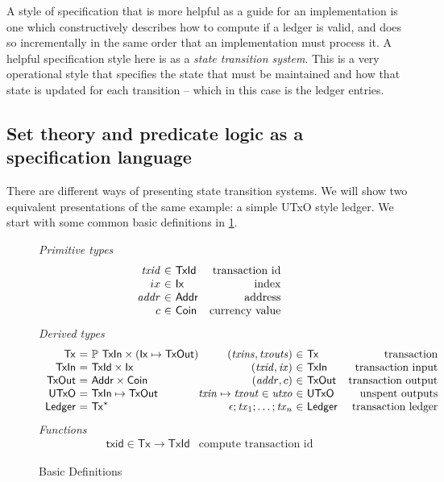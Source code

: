 \documentclass[11pt,a4paper]{article}
\newcommand{\powerset}[1]{\mathbb{P}~#1}
\newcommand{\sequencetype}[1]{#1^\star}
\newcommand{\var}[1]{\mathit{#1}}
\newcommand{\fun}[1]{\mathsf{#1}}
\newcommand{\type}[1]{\mathsf{#1}}
\begin{document}
A style of specification that is more helpful as a guide for an implementation
is one which constructively describes how to compute if a ledger is valid, and
does so incrementally in the same order that an implementation must process it.
A helpful specification style here is as a \emph{state transition system}. This
is a very operational style that specifies the state that must be maintained
and how that state is updated for each transition -- which in this case is the
ledger entries.

\subsection{Set theory and predicate logic as a specification language}

There are different ways of presenting state transition systems. We will show
two equivalent presentations of the same example: a simple UTxO style ledger.
We start with some common basic definitions in \cref{fig:basic_definitions}.

\begin{figure}

\emph{Primitive types}
%
\begin{equation*}
\begin{array}{r@{~\in~}lr}
  \var{txid}
& \type{TxId}
& \text{transaction id}
\\
  ix
& \type{Ix}
& \text{index}
\\
  \var{addr}
& \type{Addr}
& \text{address}
\\
  c
& \type{Coin}
& \text{currency value}
\end{array}
\end{equation*}
%
\emph{Derived types}
%
\begin{equation*}
\begin{array}{r@{~=~}l@{}r@{~\in~}lr}
  \type{Tx}
& \powerset{\type{TxIn}} \times (\type{Ix} \mapsto \type{TxOut})
& (\var{txins}, \var{txouts})
& \type{Tx}
& \text{transaction}
\\
  \type{TxIn}
& \type{TxId} \times \type{Ix}
& (\var{txid}, \var{ix})
& \type{TxIn}
& \text{transaction input}
\\
  \type{TxOut}
& \type{Addr} \times \type{Coin}
& (\var{addr}, c)
& \type{TxOut}
& \text{transaction output}
\\
  \type{UTxO}
& \type{TxIn} \mapsto \type{TxOut}
& \var{txin} \mapsto \var{txout} \in \var{utxo}
& \type{UTxO}
& \text{unspent outputs}
\\
  \type{Ledger}
& \sequencetype{\type{Tx}}
& \epsilon ; \var{tx}_1 ; \ldots ; \var{tx}_n 
& \type{Ledger}
& \text{transaction ledger}
\end{array}
\end{equation*}
%
\emph{Functions}
%
\begin{equation*}
\begin{array}{lr}
  \fun{txid} \in \type{Tx} \to \type{TxId}
& \text{compute transaction id}
\end{array}
\end{equation*}

\caption{Basic Definitions}
\label{fig:basic_definitions}
\end{figure}
\end{document}

